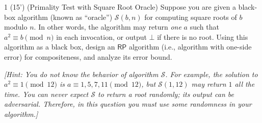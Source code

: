 \begin{question}{1 (15') (Primality Test with Square Root Oracle)}    
	Suppose you are given a black-box algorithm (known as ``oracle'') $\mathcal S(b,n)$ for computing square roots of $b$ modulo $n$. In other words, the algorithm may return \textit{one} $a$ such that $a^2\equiv b\pmod n$ in each invocation, or output $\bot$ if there is no root. Using this algorithm as a black box, design an $\mathsf{RP}$ algorithm (i.e., algorithm with one-side error) for compositeness, and analyze its error bound.
	
	\textit{[Hint: You do not know the behavior of algorithm $\mathcal S$. For example, the solution to $a^2\equiv 1\pmod{12}$ is $a\equiv 1,5,7,11\pmod{12}$, but $\mathcal S(1,12)$ may return $1$ all the time. You can never expect $\mathcal S$ to return a root randomly; its output can be adversarial. Therefore, in this question you must use some randomness in your algorithm.]}
\end{question}

